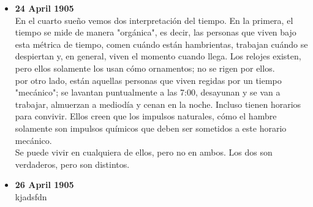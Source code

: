 \documentclass[12pt,a4paper]{report}
\begin{document}
\begin{enumerate}
{\begin{itemize}
{                Este escrito nos relata la historia de un hombre y los mundos
                que se bifurcan a partir de una decisión que toma.\\
                En el primer mundo, decide asentarse, trabajar duro, disfrutar
                momentos con sus amigos. Un día conoce a una mujer, la corteja
                a lo largo de unos meses y envejecen juntos.\\
                En el segundo mundo, decide hablar con la mujer de sus sueños.
                Su sonrisa, su risa, su elocuencia al hablar lo enamoran. Lo
                convence de cambiar de ciudad para vivir con ella y viven una
                vida apacionada. Él es feliz.\\
                En el tercer mundo, igual que en el segundo, decide hablar con
                ella, pero ella lo rechaza.\\
                Así se desarrolla la vida en este universo. Cada decisión que se
                toma se bifurca en otros mundos en los que la historia se
                desarrolla de manera diferente; y hay una infinidad de ellos.\\
            }
            \item{\textbf{24 April 1905}\\
                En el cuarto sueño vemos dos interpretación del tiempo. En la
                primera, el tiempo se mide de manera "orgánica", es decir, las
                personas que viven bajo esta métrica de tiempo, comen cuándo
                están hambrientas, trabajan cuándo se despiertan y, en general,
                viven el momento cuando llega. Los relojes existen, pero ellos
                solamente los usan cómo ornamentos; no se rigen por ellos.\\
                por otro lado, están aquellas personas que viven regidas por un
                tiempo "mecánico"; se lavantan puntualmente a las 7:00,
                desayunan y se van a trabajar, almuerzan a mediodía y cenan en
                la noche. Incluso tienen horarios para convivir. Ellos creen que
                los impulsos naturales, cómo el hambre solamente son impulsos
                químicos que deben ser sometidos a este horario mecánico.\\
                Se puede vivir en cualquiera de ellos, pero no en ambos. Los dos
                son verdaderos, pero son distintos.
            }
            \item{\textbf{26 April 1905}\\
                kjadsfdn
            }
        \end{itemize}
	}


\end{enumerate}
\end{document}
